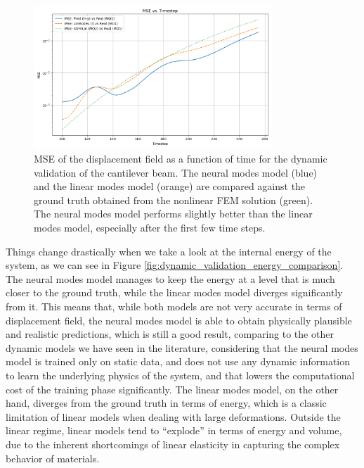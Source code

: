 \begin{figure}[ht]
    \centering
    \includegraphics[width=0.8\textwidth]{Images/beam_dynamic_mse.png}
    \caption{MSE of the displacement field as a function of time for the dynamic validation of the cantilever beam. The neural modes model (blue) and the linear modes model (orange) are compared against the ground truth obtained from the nonlinear FEM solution (green). The neural modes model performs slightly better than the linear modes model, especially after the first few time steps.}
    \label{fig:dynamic_validation_mse_comparison}
    \end{figure}

Things change drastically when we take a look at the internal energy of the system, as we can see in Figure \ref{fig:dynamic_validation_energy_comparison}. The neural modes model manages to keep the energy at a level that is much closer to the ground truth, while the linear modes model diverges significantly from it. This means that, while both models are not very accurate in terms of displacement field, the neural modes model is able to obtain physically plausible and realistic predictions, which is still a good result, comparing to the other dynamic models we have seen in the literature, considering that the neural modes model is trained only on static data, and does not use any dynamic information to learn the underlying physics of the system, and that lowers the computational cost of the training phase significantly. The linear modes model, on the other hand, diverges from the ground truth in terms of energy, which is a classic limitation of linear models when dealing with large deformations. Outside the linear regime, linear models tend to ``explode'' in terms of energy and volume, due to the inherent shortcomings of linear elasticity in capturing the complex behavior of materials.

